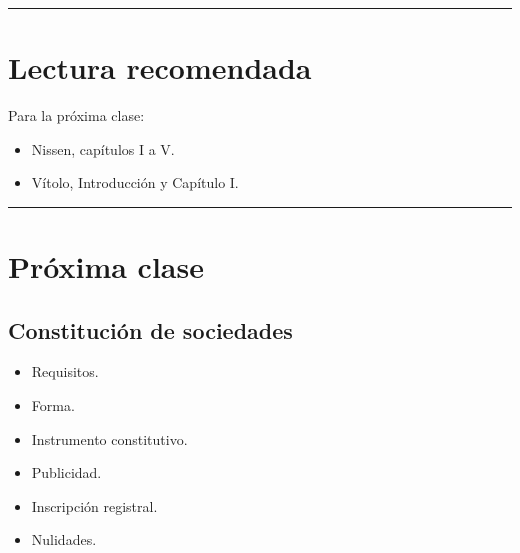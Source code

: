 \documentclass[
  spanish,
  letterpaper,
  DIV=11,
  numbers=noendperiod]{scrartcl}
\providecommand{\tightlist}{%
  \setlength{\itemsep}{0pt}\setlength{\parskip}{0pt}}
\begin{document}
\begin{center}\rule{0.5\linewidth}{0.5pt}\end{center}

\section{Lectura recomendada}\label{lectura-recomendada}

Para la próxima clase:

\begin{itemize}
\tightlist
\item
  Nissen, capítulos I a V.
\item
  Vítolo, Introducción y Capítulo I.
\end{itemize}

\begin{center}\rule{0.5\linewidth}{0.5pt}\end{center}

\section{Próxima clase}\label{pruxf3xima-clase}

\subsection{Constitución de
sociedades}\label{constituciuxf3n-de-sociedades}

\begin{itemize}
\tightlist
\item
  Requisitos.
\item
  Forma.
\item
  Instrumento constitutivo.
\item
  Publicidad.
\item
  Inscripción registral.
\item
  Nulidades.
\end{itemize}
\end{document}

